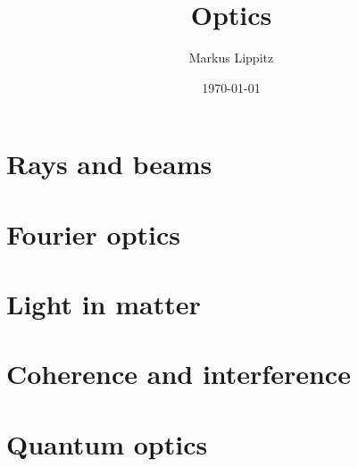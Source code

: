 \documentclass[notoc,nofonts,a4paper,twoside,nobib]{tufte-book}
\newcommand{\kapitelname}{Chapter\ }
\begin{document}
 
  \tikzexternaldisable


\title{Optics}

\author{Markus Lippitz}
\date{\today}


\maketitle


\newpage
\thispagestyle{empty}




\tableofcontents

%



\part{Rays and beams}





\part{Fourier optics}


\part{Light in matter}



\part{Coherence and interference}



\part{Quantum optics}


\renewcommand{\kapitelname}{Appendix\ }

\appendix
\appendixpage


%
\
%
 
\printbibliography
\end{document}
